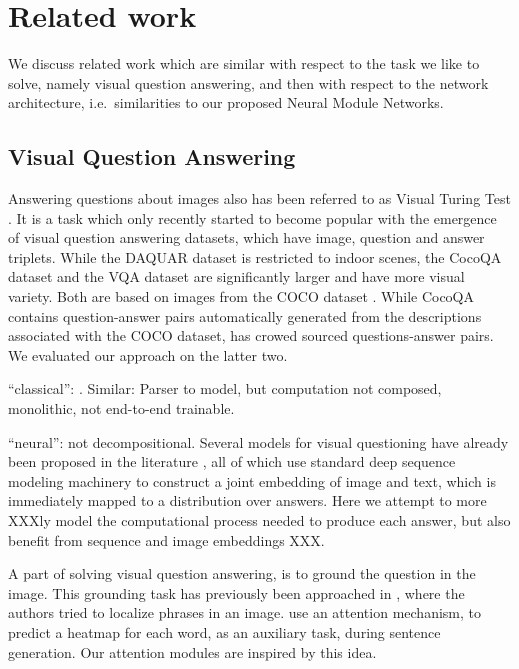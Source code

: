 \section{Related work}
We discuss related work which are similar with respect to the task we like to solve, namely visual question answering, and then with respect to the network architecture, i.e.\ similarities to our proposed Neural Module Networks.

\subsection{Visual Question Answering}
Answering questions about images also has been referred to as Visual Turing Test \cite{malinowski14nips,geman15nas}. It is a task which only recently started to become popular with the emergence of visual question answering datasets, which have image, question and answer triplets. %
While the DAQUAR dataset \cite{malinowski14nips} is restricted to indoor scenes, the CocoQA dataset \cite{yu15arxiv} and the VQA dataset \cite{antol15iccv} are significantly larger and have more visual variety. Both are based on images from the COCO dataset \cite{lin14eccv}. While CocoQA contains question-answer pairs automatically generated from the descriptions associated with the COCO dataset, \cite{antol15iccv} has crowed sourced questions-answer pairs. We evaluated our approach on the latter two.



``classical'': \cite{malinowski14nips}. Similar: Parser to model, but computation not composed, monolithic, not end-to-end trainable.

``neural'': not decompositional.
Several models for visual questioning have already been proposed in the literature \cite{ren2015image,ma15arxiv,gao2015you}, all of which use standard deep sequence modeling machinery to construct a joint embedding of image and text, which is immediately mapped to a distribution over answers. Here we attempt to more XXXly model the computational process needed to produce each answer, but also benefit from sequence and image embeddings XXX.

A part of solving visual question answering, is to ground the question in the image. This grounding task has previously been approached in \cite{karpathy14nips,plummer15iccv,karpathy15cvpr}, where the authors tried to localize phrases in an image. \cite{xu2015arxiv} use an attention mechanism, to predict a heatmap for each word, as an auxiliary task, during sentence generation. Our attention modules are inspired by this idea.

